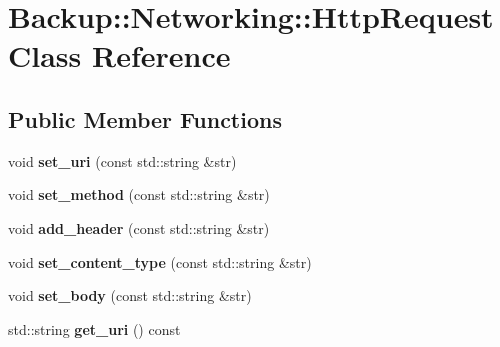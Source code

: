 \hypertarget{class_backup_1_1_networking_1_1_http_request}{}\section{Backup\+:\+:Networking\+:\+:Http\+Request Class Reference}
\label{class_backup_1_1_networking_1_1_http_request}
\subsection*{Public Member Functions}
\begin{DoxyCompactItemize}
\item 
\mbox{\label{class_backup_1_1_networking_1_1_http_request_a7e28f57fbabe252344e70cf634027796}} 
void {\bfseries set\+\_\+uri} (const std\+::string \&str)
\item 
\mbox{\label{class_backup_1_1_networking_1_1_http_request_a8f6d835d7fccdf697e34580107597345}} 
void {\bfseries set\+\_\+method} (const std\+::string \&str)
\item 
\mbox{\label{class_backup_1_1_networking_1_1_http_request_aec72630110b64ddc6d2b224371fa8905}} 
void {\bfseries add\+\_\+header} (const std\+::string \&str)
\item 
\mbox{\label{class_backup_1_1_networking_1_1_http_request_a2aefa6612b6392f430727713fa0f7f72}} 
void {\bfseries set\+\_\+content\+\_\+type} (const std\+::string \&str)
\item 
\mbox{\label{class_backup_1_1_networking_1_1_http_request_a8bf38f9f7c70ed31fe1188dba372a486}} 
void {\bfseries set\+\_\+body} (const std\+::string \&str)
\item 
\mbox{\label{class_backup_1_1_networking_1_1_http_request_ac7898a1e392ea697272ddc147dbc6cbc}} 
std\+::string {\bfseries get\+\_\+uri} () const
\item 
\mbox{\label{class_backup_1_1_networking_1_1_http_request_aead79a239c592c8cdfe029dedbd25102}} 

\end{DoxyCompactItemize}
